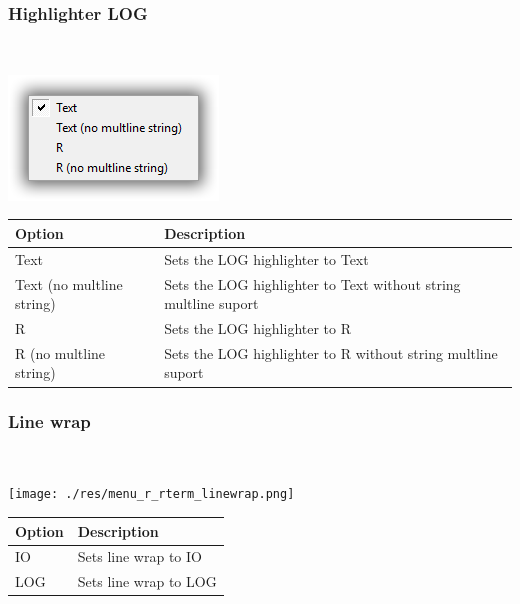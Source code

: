\hypertarget{menu_r_rterm_highlighter_Log}{}
\subsubsection{Highlighter LOG}\\

\includegraphics[scale=0.50]{./res/menu_r_rterm_highlighter_log.png}\\

\begin{scriptsize}\begin{tabularx}{\textwidth}{>{\hsize=0.3\hsize}X>{\hsize=0.7\hsize}X}\\
    \hline
    \textbf{Option} & \textbf{Description} \\
    \hline
    Text & Sets the LOG highlighter to Text \\
    Text (no multline string) & Sets the LOG highlighter to Text without string multline suport \\
    R & Sets the LOG highlighter to R \\
    R (no multline string) & Sets the LOG highlighter to R without string multline suport \\
    \hline
  \end{tabularx}\end{scriptsize}


\newpage
\hypertarget{menu_r_rterm_linewrap}{}
\subsubsection{Line wrap}\\

\texttt{[image: ./res/menu\_r\_rterm\_linewrap.png]}\\

\begin{scriptsize}\begin{tabularx}{\textwidth}{>{\hsize=0.3\hsize}X>{\hsize=0.7\hsize}X}\\
    \hline
    \textbf{Option} & \textbf{Description} \\
    \hline
    IO & Sets line wrap to IO \\
    LOG & Sets line wrap to LOG \\
    \hline
  \end{tabularx}\end{scriptsize}


